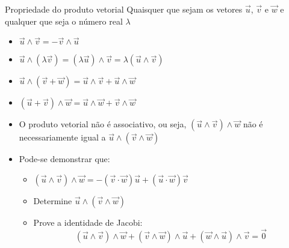 \begin{frame}{Propriedade do produto vetorial}
    Quaisquer que sejam os vetores \(\vec{u}\), \(\vec{v}\) e \(\vec{w}\) e qualquer que seja o número real \(\lambda\)
    \begin{itemize}
        \item \(\vec{u}\wedge\vec{v}=-\vec{v}\wedge\vec{u}\)
        \item \(\vec{u}\wedge(\lambda\vec{v})=(\lambda\vec{u})\wedge\vec{v}=\lambda(\vec{u}\wedge\vec{v})\)
        \item \(\vec{u}\wedge(\vec{v}+\vec{w})=\vec{u}\wedge\vec{v}+\vec{u}\wedge\vec{w}\)
        \item \((\vec{u}+\vec{v})\wedge \vec{w}=\vec{u}\wedge\vec{w}+\vec{v}\wedge\vec{w}\)
    \end{itemize}

    \begin{block}{}
        \begin{itemize}
            \item O produto vetorial não é associativo, ou seja, \((\vec{u}\wedge\vec{v})\wedge\vec{w}\) não é necessariamente igual a
                \(\vec{u}\wedge(\vec{v}\wedge\vec{w})\)

            \item Pode-se demonstrar que:
                \begin{itemize}
                    \item \((\vec{u}\wedge\vec{v})\wedge\vec{w}=-(\vec{v}\cdot\vec{w})\vec{u}+(\vec{u}\cdot\vec{w})\vec{v}\)
                    \item Determine \(\vec{u}\wedge(\vec{v}\wedge\vec{w})\)
                    \item Prove a identidade de Jacobi:
                        \[
                        (\vec{u}\wedge\vec{v})\wedge\vec{w}+
                        (\vec{v}\wedge\vec{w})\wedge\vec{u}+
                        (\vec{w}\wedge\vec{u})\wedge\vec{v}=\vec{0}
                    \]
                \end{itemize}
        \end{itemize}
    \end{block}
\end{frame}
